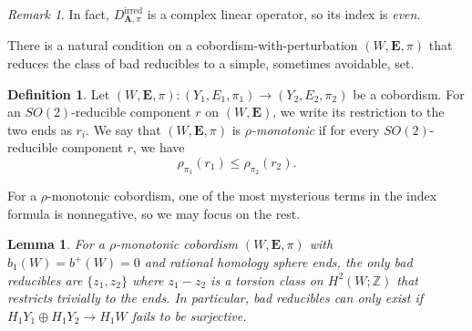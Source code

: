 \documentclass[10pt,a4paper]{amsart}
\newtheorem{lemma}[theorem]{Lemma}
\theoremstyle{definition}
\newtheorem{definition}[theorem]{Definition}
\theoremstyle{remark}
\newtheorem{remark}[theorem]{Remark}
\numberwithin{figure}{qchap}
\begin{document}
\begin{remark}In fact, $D^{\text{irred}}_{\mathbf{A},\pi}$ is a complex linear operator, so its index is \emph{even}.
\end{remark}

There is a natural condition on a cobordism-with-perturbation $(W,\mathbf{E},\pi)$ that reduces the class of bad reducibles to a simple, sometimes avoidable, set.

\begin{definition}Let $(W,\mathbf{E},\pi): (Y_1, E_1, \pi_1) \to (Y_2, E_2, \pi_2)$ be a cobordism. For an $SO(2)$-reducible component $r$ on $(W,\mathbf{E})$, we write its restriction to the two ends as $r_i$. We say that $(W,\mathbf{E},\pi)$ is \emph{$\rho$-monotonic} if for every $SO(2)$-reducible component $r$, we have $$\rho_{\pi_1}(r_1) \leq \rho_{\pi_2}(r_2).$$
\end{definition}

For a $\rho$-monotonic cobordism, one of the most mysterious terms in the index formula is nonnegative, so we may focus on the rest. 

\begin{lemma}For a $\rho$-monotonic cobordism $(W,\mathbf{E},\pi)$ with $b_1(W) = b^+(W) = 0$ and rational homology sphere ends, the only bad reducibles are $\{z_1, z_2\}$ where $z_1 - z_2$ is a torsion class on $H^2(W;\mathbb Z)$ that restricts trivially to the ends. In particular, bad reducibles can only exist if $H_1 Y_1 \oplus H_1 Y_2 \to H_1 W$ fails to be surjective.
\end{lemma}
\end{document}
